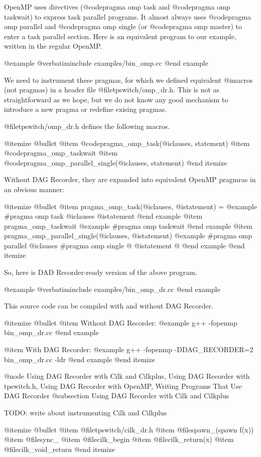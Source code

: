 OpenMP uses directives (@code{pragma omp task} and @code{pragma omp
taskwait}) to express task parallel programs.  It almost always uses
@code{pragma omp parallel} and @code{pragma omp single} (or @code{pragma
omp master}) to enter a task parallel section.  Here is an equivalent
program to our example, written in the regular OpenMP.

@example
@verbatiminclude examples/bin_omp.cc
@end example

We need to instrument these pragmas, for which we defined equivalent
@i{macros} (not pragmas) in a header file @file{tpswitch/omp_dr.h}.
This is not as straightforward as we hope, but we do not know any good
mechanism to introduce a new pragma or redefine exising pragmas.

@file{tpswitch/omp_dr.h} defines the following macros.

@itemize @bullet
@item @code{pragma_omp_task(@i{clauses, statement})}
@item @code{pragma_omp_taskwait}
@item @code{pragma_omp_parallel_single(@i{clauses, statement})}
@end itemize

Without DAG Recorder, they are expanded into equivalent OpenMP pragmras
in an obvious manner:

@itemize @bullet
@item pragma_omp_task(@i{clauses}, @i{statement}) =
@example
#pragma omp task @i{clauses}
  @i{statement}
@end example
@item pragma_omp_taskwait 
@example
#pragma omp taskwait
@end example
@item pragma_omp_parallel_single(@i{clauses}, @i{statement})
@example
#pragma omp parallel @i{clauses}
#pragma omp single
@{
  @i{statement}
@}
@end example
@end itemize

So, here is DAD Recorder-ready version of the above program.

@example
@verbatiminclude examples/bin_omp_dr.cc
@end example

This source code can be compiled with and without DAG Recorder.

@itemize @bullet
@item Without DAG Recorder:
@example
g++ -fopenmp bin_omp_dr.cc 
@end example

@item With DAG Recorder:
@example
g++ -fopenmp -DDAG_RECORDER=2 bin_omp_dr.cc -ldr
@end example
@end itemize

@node Using DAG Recorder with Cilk and Cilkplus, Using DAG Recorder with tpswitch.h, Using DAG Recorder with OpenMP, Writing Programs That Use DAG Recorder
@subsection Using DAG Recorder with Cilk and Cilkplus

TODO: write about instrumenting Cilk and Cilkplus

@itemize @bullet
@item @file{tpswitch/cilk_dr.h}
@item @file{spawn_(spawn f(x))}
@item @file{sync_}
@item @file{cilk_begin}
@item @file{cilk_return(x)}
@item @file{cilk_void_return}
@end itemize

